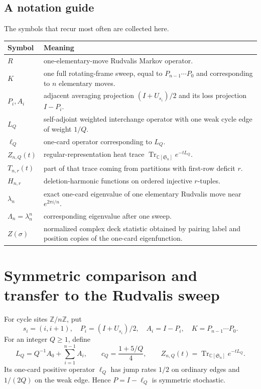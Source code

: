 \documentclass[11pt]{article}
\theoremstyle{remark}
\newcommand{\C}{\mathbb C}
\newcommand{\Sn}{\mathfrak S_n}
\newcommand{\Tr}{\operatorname{Tr}}
\begin{document}
\subsection{A notation guide}
The symbols that recur most often are collected here.
\begin{center}
\begin{tabularx}{0.97\textwidth}{@{}p{}X@{}}
\toprule
Symbol & Meaning\\
\midrule
$R$ & one-elementary-move Rudvalis Markov operator.\\
$K$ & one full rotating-frame sweep, equal to $P_{n-1}\cdots P_0$ and corresponding to $n$ elementary moves.\\
$P_i,A_i$ & adjacent averaging projection $(I+U_{s_i})/2$ and its loss projection $I-P_i$.\\
$L_Q$ & self-adjoint weighted interchange operator with one weak cycle edge of weight $1/Q$.\\
$\ell_Q$ & one-card operator corresponding to $L_Q$.\\
$Z_{n,Q}(t)$ & regular-representation heat trace $\Tr_{\C[\Sn]}e^{-tL_Q}$.\\
$T_{n,r}(t)$ & part of that trace coming from partitions with first-row deficit $r$.\\
$H_{n,r}$ & deletion-harmonic functions on ordered injective $r$-tuples.\\
$\lambda_n$ & exact one-card eigenvalue of one elementary Rudvalis move near $e^{2\pi i/n}$.\\
$\Lambda_n=\lambda_n^n$ & corresponding eigenvalue after one sweep.\\
$Z(\sigma)$ & normalized complex deck statistic obtained by pairing label and position copies of the one-card eigenfunction.\\
\bottomrule
\end{tabularx}
\end{center}

\section{Symmetric comparison and transfer to the Rudvalis sweep}\label{sec:retained}
For cycle sites $\mathbb Z/n\mathbb Z$, put
\[
 s_i=(i,i+1),\quad P_i=(I+U_{s_i})/2,\quad A_i=I-P_i,\quad
 K=P_{n-1}\cdots P_0.
\]
For an integer $Q\geq1$, define
\[
 L_Q=Q^{-1}A_0+\sum_{i=1}^{n-1}A_i,\qquad
 c_Q=\frac{1+5/Q}{4},\qquad
 Z_{n,Q}(t)=\Tr_{\C[\Sn]}e^{-tL_Q}.
\]
Its one-card positive operator $\ell_Q$ has jump rates $1/2$ on ordinary edges and $1/(2Q)$ on the weak edge. Hence $P=I-\ell_Q$ is symmetric stochastic.
\end{document}
